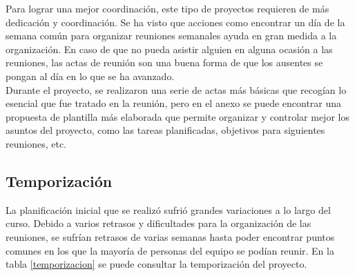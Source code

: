 Para lograr una mejor coordinación, este tipo de proyectos requieren de más dedicación y coordinación. Se ha visto que acciones como encontrar un día de la semana común para organizar reuniones semanales ayuda en gran medida a la organización. En caso de que no pueda asistir alguien en alguna ocasión a las reuniones, las actas de reunión son una buena forma de que los ausentes se pongan al día en lo que se ha avanzado.\\

Durante el proyecto, se realizaron una serie de actas más básicas que recogían lo esencial que fue tratado en la reunión, pero en el anexo se puede encontrar una propuesta de plantilla más elaborada que permite organizar y controlar mejor los asuntos del proyecto, como las tareas planificadas, objetivos para siguientes reuniones, etc.

\subsection{Temporización}
La planificación inicial que se realizó sufrió grandes variaciones a lo largo del curso. Debido a varios retrasos y dificultades para la organización de las reuniones, se sufrían retrasos de varias semanas hasta poder encontrar puntos comunes en los que la mayoría de personas del equipo se podían reunir. En la tabla \ref{temporizacion} se puede consultar la temporización del proyecto.\\

